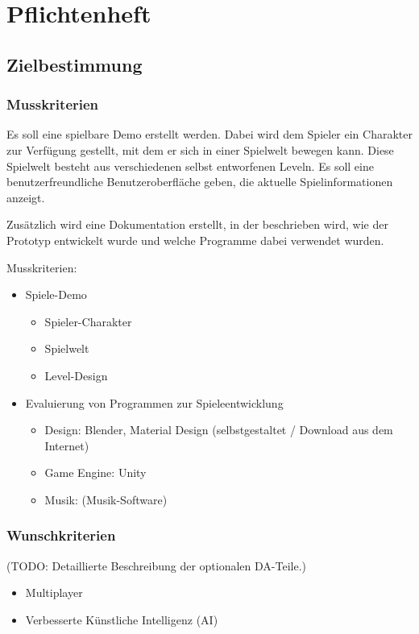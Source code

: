 \pagebreak
{}
\chapter{Pflichtenheft}
\section{Zielbestimmung}
\subsection{Musskriterien}

Es soll eine spielbare Demo erstellt werden. Dabei wird dem Spieler ein Charakter zur Verfügung gestellt, mit dem er sich in einer Spielwelt bewegen kann. Diese Spielwelt besteht aus verschiedenen selbst entworfenen Leveln. Es soll eine benutzerfreundliche Benutzeroberfläche geben, die aktuelle Spielinformationen anzeigt.

Zusätzlich wird eine Dokumentation erstellt, in der beschrieben wird, wie der Prototyp entwickelt wurde und welche Programme dabei verwendet wurden.

Musskriterien:
\begin{itemize}
  \item Spiele-Demo
  \begin{itemize}
    \item Spieler-Charakter
    \item Spielwelt
    \item Level-Design
  \end{itemize}
  \item Evaluierung von Programmen zur Spieleentwicklung
  \begin{itemize}
    \item Design: Blender, Material Design (selbstgestaltet / Download aus dem Internet)
    \item Game Engine: Unity
    \item Musik: (Musik-Software)
  \end{itemize}
\end{itemize}

\subsection{Wunschkriterien}
(TODO: 
Detaillierte Beschreibung der optionalen DA-Teile.)

\begin{itemize}
  \item Multiplayer
  \item Verbesserte Künstliche Intelligenz (AI)
\end{itemize}


